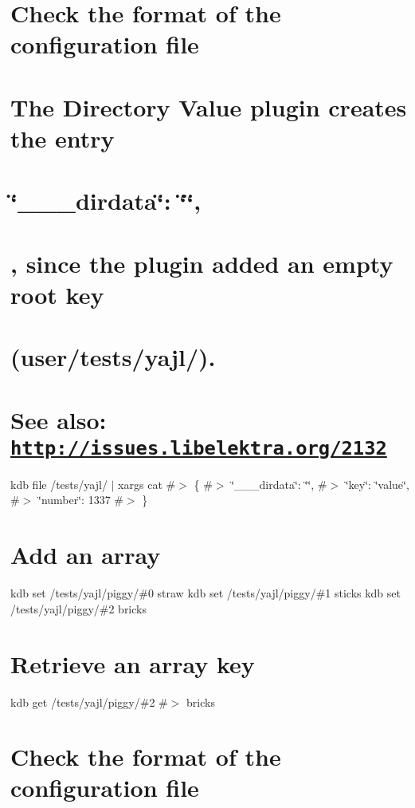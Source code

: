 \section*{Check the format of the configuration file}

\section*{The Directory Value plugin creates the entry}

\section*{\char`\"{}\+\_\+\+\_\+\+\_\+dirdata\char`\"{}\+: \char`\"{}\char`\"{},}

\section*{, since the plugin added an empty root key}

\section*{({\ttfamily user/tests/yajl/}).}

\section*{See also\+: \href{http://issues.libelektra.org/2132}{\tt http\+://issues.\+libelektra.\+org/2132}}

kdb file /tests/yajl/ $\vert$ xargs cat \#$>$ \{ \#$>$ \char`\"{}\+\_\+\+\_\+\+\_\+dirdata\char`\"{}\+: \char`\"{}\char`\"{}, \#$>$ \char`\"{}key\char`\"{}\+: \char`\"{}value\char`\"{}, \#$>$ \char`\"{}number\char`\"{}\+: 1337 \#$>$ \}

\section*{Add an array}

kdb set /tests/yajl/piggy/\#0 straw kdb set /tests/yajl/piggy/\#1 sticks kdb set /tests/yajl/piggy/\#2 bricks

\section*{Retrieve an array key}

kdb get /tests/yajl/piggy/\#2 \#$>$ bricks

\section*{Check the format of the configuration file}

